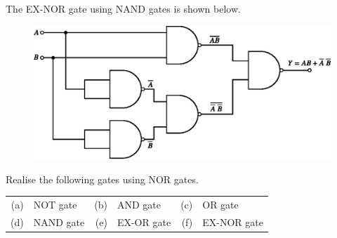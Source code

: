 \begin{solution}
\begin{itemize}
The EX-NOR gate using NAND gates is shown below.
\begin{figure}[H]
\centering
\includegraphics{chap6/fig103.eps}
\end{figure}
\end{itemize}
\end{solution}

\begin{example}\label{exam6.28}
Realise the following gates using NOR gates.
\begin{center}
\begin{tabular}{r@{\;\,}l@{\qquad}r@{\;\,}l@{\qquad}r@{\;\,}l}
(a) & NOT gate & (b) & AND gate & (c) & OR gate\\[3pt]
(d) & NAND gate & (e) & EX-OR gate & (f) & EX-NOR gate 
\end{tabular}
\end{center}
\end{example}

